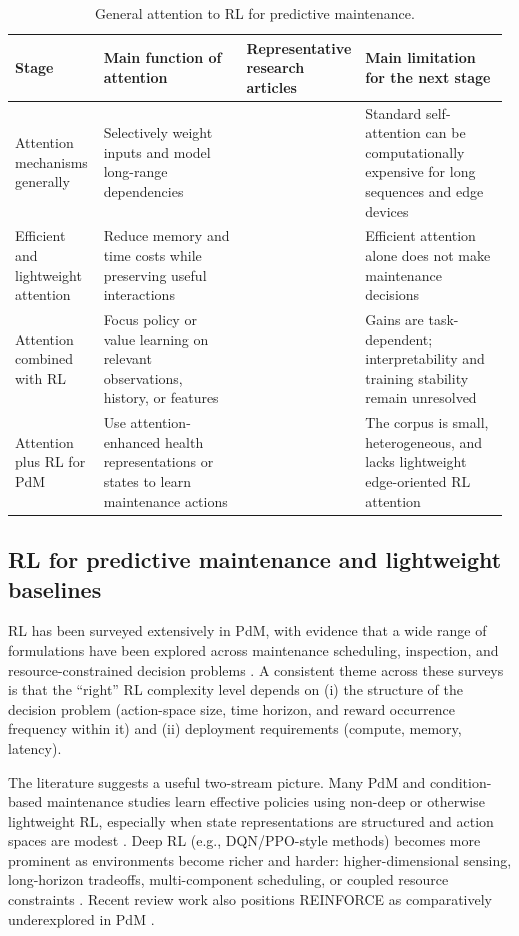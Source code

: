 \documentclass[sn-basic]{sn-jnl}%
\begin{document}
\begin{table}[h]
\centering
\caption{General attention to RL for predictive maintenance.}
\label{tab:attention_funnel_synthesis}
	\begin{tabular}{L{0.18\linewidth} L{0.30\linewidth} L{0.20\linewidth} L{0.30\linewidth}}
	\toprule
	\textbf{Stage} & \textbf{Main function of attention} & \textbf{Representative research articles} & \textbf{Main limitation for the next stage}\\
	\midrule
	Attention mechanisms generally & Selectively weight inputs and model long-range dependencies & \cite{Bahdanau2014,Vaswani2017,Luong2015} & Standard self-attention can be computationally expensive for long sequences and edge devices\\
	Efficient and lightweight attention & Reduce memory and time costs while preserving useful interactions & \cite{Choromanski2020, Siraskar2024,Wang2020Linformer} & Efficient attention alone does not make maintenance decisions\\
	Attention combined with RL & Focus policy or value learning on relevant observations, history, or features & \cite{BlakemanMareschal2022,Mott2019,Sorokin2015,Wu2021} & Gains are task-dependent; interpretability and training stability remain unresolved\\
	Attention plus RL for PdM & Use attention-enhanced health representations or states to learn maintenance actions & \cite{Guo2026,Luong2015, Zhao2024} & The corpus is small, heterogeneous, and lacks lightweight edge-oriented RL attention\\
	\bottomrule
	\end{tabular}
\end{table}

\subsection{RL for predictive maintenance and lightweight baselines}
RL has been surveyed extensively in PdM, with evidence that a wide range of formulations have been explored across maintenance scheduling, inspection, and resource-constrained decision problems \cite{Siraskar2023, Ogunfowora2023, Zhang2024}. A consistent theme across these surveys is that the ``right'' RL complexity level depends on (i) the structure of the decision problem (action-space size, time horizon, and reward occurrence frequency within it) and (ii) deployment requirements (compute, memory, latency).

The literature suggests a useful two-stream picture. Many PdM and condition-based maintenance studies learn effective policies using non-deep or otherwise lightweight RL, especially when state representations are structured and action spaces are modest \cite{Adsule2020, Yousefi2020, Rasay2024, Dadash2024}. Deep RL (e.g., DQN/PPO-style methods) becomes more prominent as environments become richer and harder: higher-dimensional sensing, long-horizon tradeoffs, multi-component scheduling, or coupled resource constraints \cite{Liu2020, Chen2023, Lee2022, Ong2022-02}. Recent review work also positions \textsc{REINFORCE} as comparatively underexplored in PdM \cite{Siraskar2025}.
\end{document}
